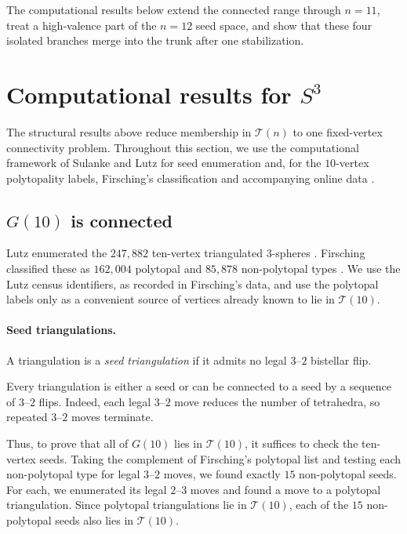 \documentclass[11pt]{article}
\theoremstyle{remark}
\theoremstyle{plain}
\begin{document}
The computational results below extend the connected range through
\(n=11\), treat a high-valence part of the \(n=12\) seed space, and show
that these four isolated branches merge into the trunk
after one stabilization.

\section{Computational results for \texorpdfstring{\(S^3\)}{S3}}
\label{sec:experiments}

The structural results above reduce membership in \(\mathcal T(n)\) to one
fixed-vertex connectivity problem.  Throughout this section, we use the
computational framework of Sulanke and Lutz \cite{SL09} for seed enumeration
and, for the \(10\)-vertex polytopality labels, Firsching's classification
and accompanying online data \cite{F17,F-Data}.

\subsection{\texorpdfstring{\(G(10)\)}{G(10)} is connected}

Lutz enumerated the \(247{,}882\) ten-vertex triangulated
\(3\)-spheres \cite{Lutz08}.  Firsching classified these as \(162{,}004\)
polytopal and \(85{,}878\) non-polytopal types \cite{F17,F-Data}.  We use the
Lutz census identifiers, as recorded in Firsching's data, and use the
polytopal labels only as a convenient source of vertices already known to lie
in \(\mathcal T(10)\).

\paragraph{Seed triangulations.}
A triangulation is a \emph{seed triangulation} if it admits no legal
\(3\)--\(2\) bistellar flip.

Every triangulation is either a seed or can be connected to a seed by a
sequence of \(3\)--\(2\) flips.  Indeed, each legal \(3\)--\(2\) move
reduces the number of tetrahedra, so repeated \(3\)--\(2\) moves terminate.

Thus, to prove that all of \(G(10)\) lies in \(\mathcal T(10)\), it
suffices to check the ten-vertex seeds.  Taking the complement of Firsching's
polytopal list and testing each non-polytopal type for legal \(3\)--\(2\)
moves, we found exactly \(15\) non-polytopal seeds.  For each, we enumerated
its legal \(2\)--\(3\) moves and found a move to a polytopal triangulation.
Since polytopal triangulations lie in \(\mathcal T(10)\), each of the \(15\)
non-polytopal seeds also lies in \(\mathcal T(10)\).
\end{document}
